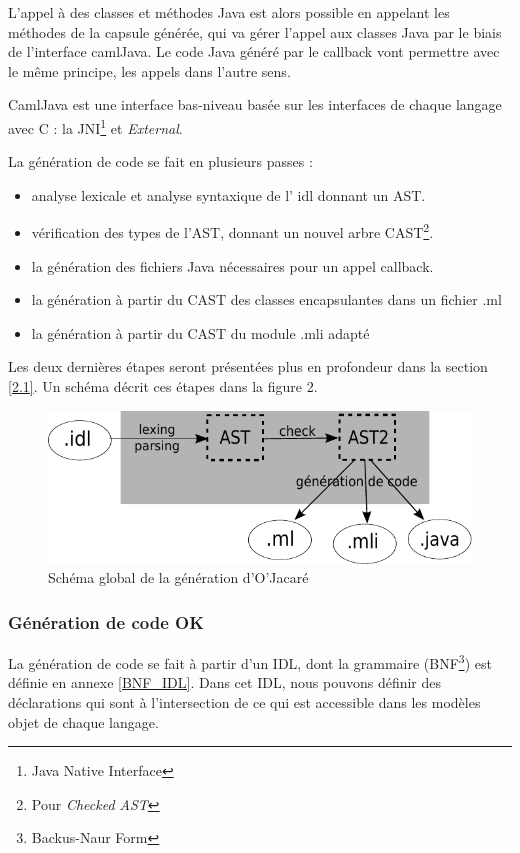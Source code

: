 \documentclass[a4paper, 11pt]{article}
\begin{document}
L'appel à des classes et méthodes Java est alors possible en appelant
les méthodes de la capsule générée, qui va gérer l'appel aux classes
Java par le biais de l'interface camlJava.
Le code Java généré par le callback vont permettre avec le même
principe, les appels dans l'autre sens.

CamlJava est une interface bas-niveau basée sur les interfaces de chaque langage avec C : la JNI\footnote{Java Native Interface} et \emph{External}.

La génération de code se fait en plusieurs passes :
\begin{itemize}
\item analyse lexicale et analyse syntaxique de l' idl donnant un AST.
\item vérification des types de l'AST, donnant un nouvel arbre CAST\footnote{Pour \emph{Checked AST}}.
\item la génération des fichiers Java nécessaires pour un appel callback. 
\item la génération à partir du CAST des classes encapsulantes dans un fichier .ml
\item la génération à partir du CAST du module .mli adapté
\end{itemize}
Les deux dernières étapes seront présentées plus en profondeur dans la
section \ref{2.1}.
Un schéma décrit ces étapes dans la figure 2. 

\begin{figure}[h]
  \centering
  \includegraphics{schemaOjacare.pdf}
  \caption{Schéma global de la génération d'O'Jacaré}
\end{figure}

\newpage

\subsubsection{Génération de code OK}
La génération de code se fait à partir d'un IDL, dont la grammaire
(BNF\footnote{Backus-Naur Form}) est définie en annexe \ref{BNF_IDL}.
Dans cet IDL, nous pouvons définir des déclarations qui sont à
l'intersection de ce qui est accessible dans les modèles objet de
chaque langage. 
\end{document}
